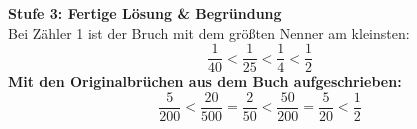 \documentclass[a4paper,10pt]{article}
\newcommand{\mFrac}[2]{\frac{#1}{#2}}
\begin{document}
\begin{tcolorbox}[
    enhanced, colback=white, colframe=primaryBlue, arc=3mm, boxrule=1.2pt,
    left=4.5mm, right=4.5mm, top=2.5mm, bottom=2.5mm, height=12.9cm
]
    \begin{tcolorbox}[colback=step3Bg, colframe=step3Border, arc=2mm, boxrule=0.7pt, left=3mm, right=3mm, top=1.8mm, bottom=1.8mm]
        {\color{step3Text}\bfseries\faCheckCircle\enskip Stufe 3: Fertige Lösung \& Begründung}\\[0.8mm]
        {\small
        Bei Zähler 1 ist der Bruch mit dem größten Nenner am kleinsten:
        \[
            \mFrac{1}{40} < \mFrac{1}{25} < \mFrac{1}{4} < \mFrac{1}{2}
        \]
        \textbf{Mit den Originalbrüchen aus dem Buch aufgeschrieben:}
        \[
            \mFrac{5}{200} < \mFrac{20}{500} = \mFrac{2}{50} < \mFrac{50}{200} = \mFrac{5}{20} < \mFrac{1}{2}
        \]
        }
    \end{tcolorbox}
\end{tcolorbox}

\newpage

\end{document}
